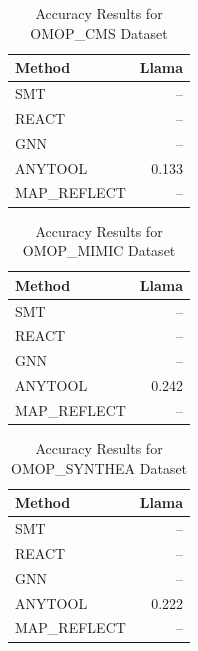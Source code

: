 
\begin{table}[htbp]
\centering
\caption{Accuracy Results for OMOP_CMS Dataset}
\label{tab:omop_cms_accuracy}
\begin{tabular}{lr}
\toprule
\textbf{Method} & \textbf{Llama} \\
\midrule
SMT & -- \\
REACT & -- \\
GNN & -- \\
ANYTOOL & 0.133 \\
MAP_REFLECT & -- \\
\bottomrule
\end{tabular}
\end{table}

\begin{table}[htbp]
\centering
\caption{Accuracy Results for OMOP_MIMIC Dataset}
\label{tab:omop_mimic_accuracy}
\begin{tabular}{lr}
\toprule
\textbf{Method} & \textbf{Llama} \\
\midrule
SMT & -- \\
REACT & -- \\
GNN & -- \\
ANYTOOL & 0.242 \\
MAP_REFLECT & -- \\
\bottomrule
\end{tabular}
\end{table}

\begin{table}[htbp]
\centering
\caption{Accuracy Results for OMOP_SYNTHEA Dataset}
\label{tab:omop_synthea_accuracy}
\begin{tabular}{lr}
\toprule
\textbf{Method} & \textbf{Llama} \\
\midrule
SMT & -- \\
REACT & -- \\
GNN & -- \\
ANYTOOL & 0.222 \\
MAP_REFLECT & -- \\
\bottomrule
\end{tabular}
\end{table}

